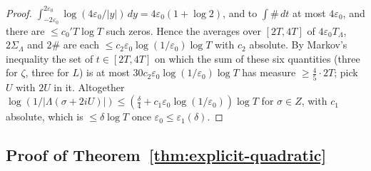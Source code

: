 \documentclass[11pt,a4paper]{article}
\theoremstyle{remark}\newtheorem{remark}[theorem]{Remark}
\begin{document}
\begin{proof}
$\int_{-2\varepsilon_0}^{2\varepsilon_0}\log(4\varepsilon_0/|y|)\,dy=4\varepsilon_0(1+\log2)$, and to $\int\#\,dt$ at most $4\varepsilon_0$, and
there are $\le c_0'T\log T$ such zeros. Hence the averages over $[2T,4T]$ of $4\varepsilon_0T_\Lambda$, $2\Sigma_\Lambda$ and $2\#$
are each $\le c_2\varepsilon_0\log(1/\varepsilon_0)\log T$ with $c_2$ absolute. By Markov's inequality the set of $t\in[2T,4T]$ on
which the sum of these six quantities (three for $\zeta$, three for $L$) is at most $30c_2\varepsilon_0\log(1/\varepsilon_0)\log T$ has
measure $\ge\tfrac45\cdot2T$; pick $U$ with $2U$ in it. Altogether $\log(1/|\Lambda(\sigma+2iU)|)\le(\tfrac\delta4+c_1\varepsilon_0\log(1/\varepsilon_0))\log T$
for $\sigma\in Z$, with $c_1$ absolute, which is $\le\delta\log T$ once $\varepsilon_0\le\varepsilon_1(\delta)$.
\end{proof}

\subsection{Proof of Theorem~\ref{thm:explicit-quadratic}}
\end{document}
